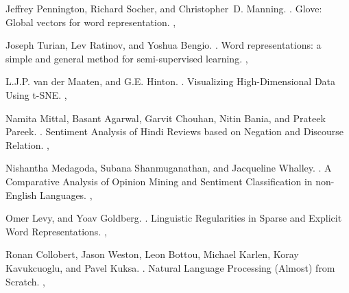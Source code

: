 \def\DevnagVersion{2.15}\documentclass[11pt]{article}
\begin{document}
\begin{thebibliography}{40}
   
Jeffrey Pennington, Richard Socher, and Christopher~D. Manning.
.
\newblock Glove: Global vectors for word representation.
,


Joseph Turian, Lev Ratinov, and Yoshua Bengio.
.
\newblock Word representations: a simple and general method for semi-supervised learning.
,

L.J.P. van der Maaten, and G.E. Hinton.
.
\newblock Visualizing High-Dimensional Data Using t-SNE.
,

Namita Mittal, Basant Agarwal, Garvit Chouhan, Nitin Bania, and Prateek Pareek.
.
\newblock Sentiment Analysis of Hindi Reviews based on Negation and Discourse Relation.
,
   
Nishantha Medagoda, Subana Shanmuganathan, and Jacqueline Whalley.
.
\newblock A Comparative Analysis of Opinion Mining and Sentiment Classification in non-English Languages.
,


Omer Levy, and Yoav Goldberg.
.
\newblock Linguistic Regularities in Sparse and Explicit Word Representations.
,

Ronan Collobert, Jason Weston, Leon Bottou, Michael Karlen, Koray Kavukcuoglu, and Pavel Kuksa.
.
\newblock Natural Language Processing (Almost) from Scratch.
,


\end{thebibliography}
\end{document}
